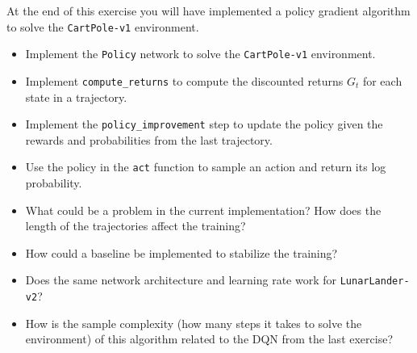 \documentclass{exam}
\begin{document}
\noindent At the end of this exercise you will have implemented a policy gradient algorithm to solve the \texttt{CartPole-v1} environment.

\begin{questions}
	\indent
	\begin{itemize}
		\item Implement the \texttt{Policy} network to solve the \texttt{CartPole-v1} environment.
		\item Implement \texttt{compute\_returns} to compute the discounted returns $G_t$ for each state in a trajectory.
		\item Implement the \texttt{policy\_improvement} step to update the policy given the rewards and probabilities from the last trajectory.
		\item Use the policy in the \texttt{act} function to sample an action and return its log probability.
	\end{itemize}	
	\indent
	\begin{itemize}
		\item What could be a problem in the current implementation? How does the length of the trajectories affect the training?
		\item How could a baseline be implemented to stabilize the training?
		\item Does the same network architecture and learning rate work for \texttt{LunarLander-v2}?
		\item How is the sample complexity (how many steps it takes to solve the environment) of this algorithm related to the DQN from the last exercise?
	\end{itemize}
\end{questions}
\end{document}
